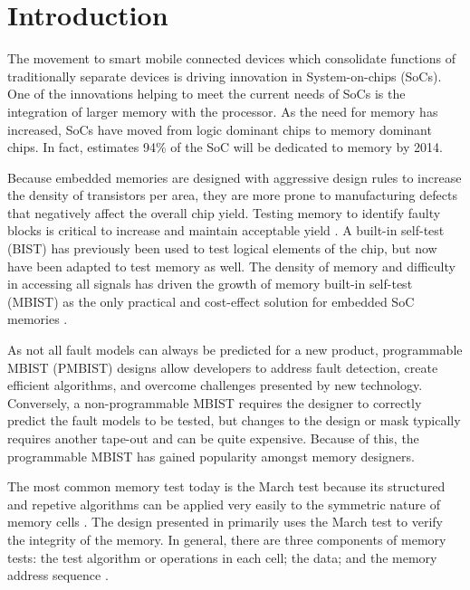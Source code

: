 \chapter{Introduction}
\label{chap:introduction}
The movement to smart mobile connected devices which consolidate functions of traditionally separate devices is driving innovation in System-on-chips (SoCs).  One of the innovations helping to meet the current needs of SoCs is the integration of larger memory with the processor.  As the need for memory has increased, SoCs have moved from logic dominant chips to memory dominant chips.  In fact, \cite{1327984} estimates 94\% of the SoC will be dedicated to memory by 2014.  

Because embedded memories are designed with aggressive design rules to increase the density of transistors per area, they are more prone to manufacturing defects that negatively affect the overall chip yield.  Testing memory to identify faulty blocks is critical to increase and maintain acceptable yield \cite{1395663}. 
A built-in self-test (BIST) has previously been used to test logical elements of the chip, but now have been adapted to test memory as well.  The density of memory and difficulty in accessing all signals has driven the growth of memory built-in self-test (MBIST) as the only practical and cost-effect solution for embedded SoC memories \cite{5875994}.  

As not all fault models can always be predicted for a new product, programmable MBIST (PMBIST) designs allow developers to address fault detection, create efficient algorithms, and overcome challenges presented by new technology.  Conversely, a non-programmable MBIST requires the designer to correctly predict the fault models to be tested, but changes to the design or mask typically requires another tape-out and can be quite expensive.  Because of this, the programmable MBIST has gained popularity amongst memory designers. 

The most common memory test today is the March test because its structured and repetive algorithms can be applied very easily to the symmetric nature of memory cells \cite{1675150}.  The design presented in \cite{1584083} primarily uses the March test to verify the integrity of the memory.  In general, there are three components of memory tests: the test algorithm or operations in each cell; the data; and the memory address sequence \cite{5993815}.  

